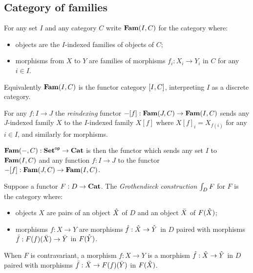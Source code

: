 \subsection{Category of families}

\begin{definition}
For any set $I$ and any category $C$ write $\mathbf{Fam}(I,C)$ for the category where:
\begin{itemize}
\item objects are the $I$-indexed families of objects of $C$;
\item morphisms from $X$ to $Y$ are families of morphisms $f_i: X_i \to Y_i$ in $C$ for any $i \in I$.
\end{itemize}
\end{definition}

\noindent Equivalently $\mathbf{Fam}(I,C)$ is the functor category $[I,C]$, interpreting $I$ as a discrete
category.

\begin{definition}[Reindexing]
For any $f: I \to J$ the \emph{reindexing} functor $-[f]: \mathbf{Fam}(J,C) \to \mathbf{Fam}(I,C)$ sends any
$J$-indexed family $X$ to the $I$-indexed family $X[f]$ where $X[f]_i = X_{f(i)}$ for any $i \in I$, and
similarly for morphisms.
\end{definition}

\begin{definition}
$\mathbf{Fam}(-,C): \mathbf{Set}^{\mathsf{op}} \to \mathbf{Cat}$ is then the functor which sends any set $I$ to $\mathbf{Fam}(I,C)$ and any function
$f: I \to J$ to the functor $-[f]: \mathbf{Fam}(J,C) \to \mathbf{Fam}(I,C)$.
\end{definition}

\begin{definition}
Suppose a functor $F: D \to \mathbf{Cat}$. The \emph{Grothendieck construction} $\int_{D}F$ for $F$ is the
category where:
\begin{itemize}
\item objects $X$ are pairs of an object $\hat{X}$ of $D$ and an object $\bar{X}$ of $F(\hat{X})$;
\item morphisms $f: X \to Y$ are morphisms $\hat{f}: \hat{X} \to \hat{Y}$ in $D$ paired with morphisms
$\bar{f}: F(f)(\bar{X}) \to \bar{Y}$ in $F(\hat{Y})$.
\end{itemize}
\end{definition}

\noindent When $F$ is contravariant, a morphism $f: X \to Y$ is a morphism $\hat{f}: \hat{X} \to \hat{Y}$ in
$D$ paired with morphisms $\bar{f}: \bar{X} \to F(f)(\bar{Y})$ in $F(\hat{X})$.

